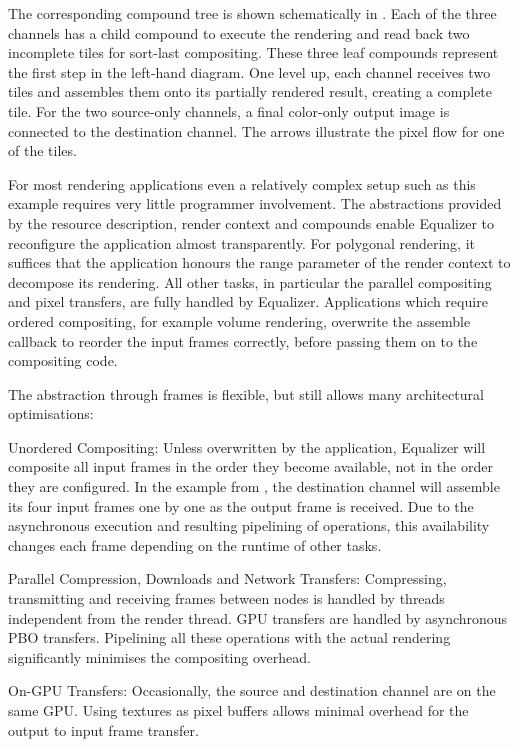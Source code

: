The corresponding compound tree is shown schematically in .
Each of the three channels has a child compound to execute the rendering and
read back two incomplete tiles for sort-last compositing. These three leaf
compounds represent the first step in the left-hand diagram. One level up, each
channel receives two tiles and assembles them onto its partially rendered
result, creating a complete tile. For the two source-only channels, a final
color-only output image is connected to the destination channel. The arrows
illustrate the pixel flow for one of the tiles.

For most rendering applications even a relatively complex setup such as this
example requires very little programmer involvement. The abstractions provided
by the resource description, render context and compounds enable Equalizer to
reconfigure the application almost transparently. For polygonal rendering, it
suffices that the application honours the \textsf{range} parameter of the render
context to decompose its rendering. All other tasks, in particular the parallel
compositing and pixel transfers, are fully handled by Equalizer. Applications
which require ordered compositing, for example volume rendering, overwrite the
assemble callback to reorder the input frames correctly, before passing them on
to the compositing code.

The abstraction through frames is flexible, but still allows many architectural
optimisations:
\begin{compactdesc}
\item[Unordered Compositing:] Unless overwritten by the application, Equalizer
will composite all input frames in the order they become available, not in the
order they are configured. In the example from , the
destination channel will assemble its four input frames one by one as the output
frame is received. Due to the asynchronous execution and resulting pipelining of
operations, this availability changes each frame depending on the runtime of
other tasks.

\item[Parallel Compression, Downloads and Network Transfers:] Compressing,
transmitting and receiving frames between nodes is handled by threads
independent from the render thread. GPU transfers are handled by asynchronous
PBO transfers. Pipelining all these operations with the actual rendering
significantly minimises the compositing overhead.

\item[On-GPU Transfers:] Occasionally, the source and destination channel are on
the same GPU. Using textures as pixel buffers allows minimal overhead for the
output to input frame transfer.
\end{compactdesc}

